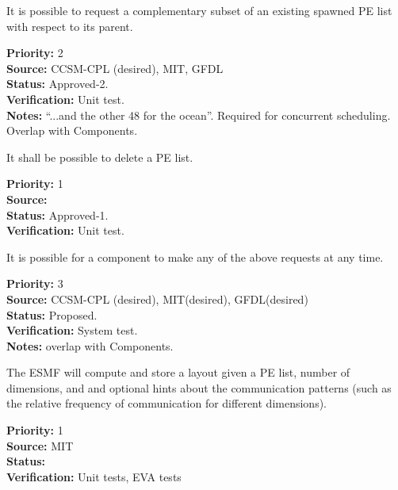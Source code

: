 
It is possible to request a complementary subset of an existing spawned
PE list with respect to its parent.

\begin{reqlist}
{\bf Priority:}  2 \\
{\bf Source:}  CCSM-CPL (desired), MIT, GFDL \\
{\bf Status:} Approved-2. \\
{\bf Verification:} Unit test.\\ 
{\bf Notes:}  ``...and the other 48 for the ocean''.
  Required for concurrent scheduling.  Overlap with Components.
\end{reqlist}

It shall be possible to delete a PE list.

\begin{reqlist}
{\bf Priority:} 1 \\
{\bf Source:}  \\
{\bf Status:} Approved-1. \\
{\bf Verification:} Unit test.\\ 
\end{reqlist}


It is possible for a component to make any of the above requests at
any time.

\begin{reqlist}
{\bf Priority:} 3 \\
{\bf Source:}  CCSM-CPL (desired), MIT(desired), GFDL(desired) \\
{\bf Status:} Proposed. \\
{\bf Verification:} System test. \\
{\bf Notes:} overlap with Components.
\end{reqlist}


The ESMF will compute and store a layout given a PE list, number of dimensions, 
and and optional hints about the communication patterns (such as the 
relative frequency of communication for different dimensions).
\begin{reqlist}
  {\bf Priority:} 1 \\
  {\bf Source:}  MIT \\
  {\bf Status:}  \\
  {\bf Verification:} Unit tests, EVA tests \\
\end{reqlist}

